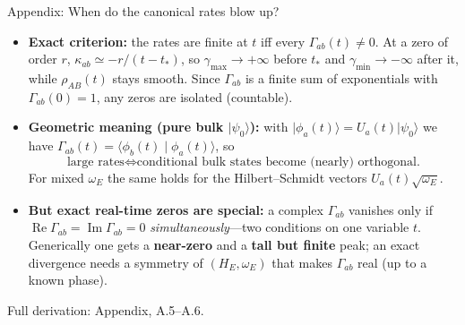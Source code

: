 \documentclass[aspectratio=169,11pt]{beamer}
\newcommand{\ket}[1]{\lvert #1\rangle}
\newcommand{\appref}[1]{{\color{muted}\footnotesize Full derivation: Appendix, #1.}}
\newcommand{\ongoing}{{\color{muted}\footnotesize Ongoing analysis.}}
\begin{document}
\begin{frame}{Appendix: When do the canonical rates blow up?}
\small
\begin{itemize}\setlength\itemsep{4pt}
\item \textbf{Exact criterion:} the rates are finite at $t$ iff every $\Gamma_{ab}(t)\neq0$. At a zero of order $r$, $\kappa_{ab}\simeq-r/(t-t_*)$, so $\gamma_{\max}\to+\infty$ before $t_*$ and $\gamma_{\min}\to-\infty$ after it, while $\rho_{AB}(t)$ stays smooth. Since $\Gamma_{ab}$ is a finite sum of exponentials with $\Gamma_{ab}(0)=1$, any zeros are isolated (countable).
\item \textbf{Geometric meaning (pure bulk $\ket{\psi_0}$):} with $\ket{\phi_a(t)}=U_a(t)\ket{\psi_0}$ we have $\Gamma_{ab}(t)=\langle\phi_b(t)\mid\phi_a(t)\rangle$, so
\[
\boxed{\text{large rates}\iff\text{conditional bulk states become (nearly) orthogonal.}}
\]
For mixed $\omega_E$ the same holds for the Hilbert--Schmidt vectors $U_a(t)\sqrt{\omega_E}$.
\item \textbf{But exact real-time zeros are special:} a complex $\Gamma_{ab}$ vanishes only if $\operatorname{Re}\Gamma_{ab}=\operatorname{Im}\Gamma_{ab}=0$ \emph{simultaneously}---two conditions on one variable $t$. Generically one gets a \textbf{near-zero} and a \textbf{tall but finite} peak; an exact divergence needs a symmetry of $(H_E,\omega_E)$ that makes $\Gamma_{ab}$ real (up to a known phase).
\end{itemize}
\appref{A.5--A.6}\quad \ongoing
\end{frame}
\end{document}
